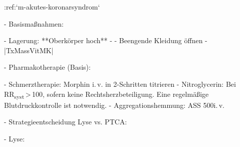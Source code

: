 
:ref:`m-akutes-koronarsyndrom`


\begin{itemize}
  -   Basismaßnahmen:
  \begin{itemize}
    -   Lagerung: **Oberkörper hoch**
    -   
    -   Beengende Kleidung öffnen
    -   |TxMassVitMK|
  \end{itemize}
  -   Pharmakotherapie (Basis):
  \begin{itemize}
  -   Schmerztherapie: Morphin i.\,v. in 2\Mg*-Schritten titrieren
  -   Nitroglycerin: Bei RR\textsubscript{syst}\,{\textgreater}\,100\MmHg*, 
  sofern keine Rechtsherzbeteiligung.
  Eine regelmäßige Blutdruckkontrolle ist notwendig.
  -   Aggregationshemmung: ASS 500\Mg* i.\,v.
  \end{itemize}
  -   Strategieentscheidung Lyse vs. PTCA:
  \begin{itemize}
    -   Lyse:
  \end{itemize}
\end{itemize}


